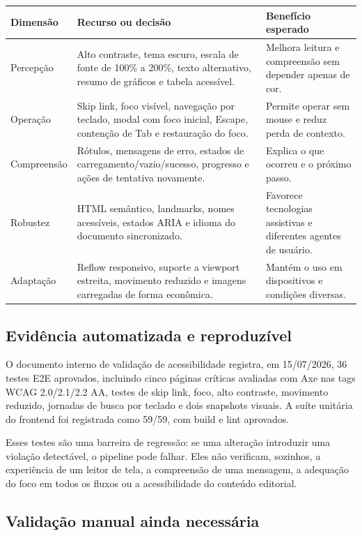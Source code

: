 \documentclass[11pt,a4paper]{article}
\begin{document}
\begin{longtable}{P{0.25\textwidth}P{0.42\textwidth}P{0.23\textwidth}}
\toprule
\textbf{Dimensão} & \textbf{Recurso ou decisão} & \textbf{Benefício esperado} \\
\midrule
\endhead
\bottomrule
\endfoot
Percepção & Alto contraste, tema escuro, escala de fonte de 100\% a 200\%, texto alternativo, resumo de gráficos e tabela acessível. & Melhora leitura e compreensão sem depender apenas de cor. \\
Operação & Skip link, foco visível, navegação por teclado, modal com foco inicial, Escape, contenção de Tab e restauração do foco. & Permite operar sem mouse e reduz perda de contexto. \\
Compreensão & Rótulos, mensagens de erro, estados de carregamento/vazio/sucesso, progresso e ações de tentativa novamente. & Explica o que ocorreu e o próximo passo. \\
Robustez & HTML semântico, landmarks, nomes acessíveis, estados ARIA e idioma do documento sincronizado. & Favorece tecnologias assistivas e diferentes agentes de usuário. \\
Adaptação & Reflow responsivo, suporte a viewport estreita, movimento reduzido e imagens carregadas de forma econômica. & Mantém o uso em dispositivos e condições diversas. \\
\end{longtable}

\subsection{Evidência automatizada e reproduzível}

O documento interno de validação de acessibilidade registra, em 15/07/2026, 36 testes E2E aprovados, incluindo cinco páginas críticas avaliadas com Axe nas tags WCAG 2.0/2.1/2.2 AA, testes de skip link, foco, alto contraste, movimento reduzido, jornadas de busca por teclado e dois snapshots visuais. A suíte unitária do frontend foi registrada como 59/59, com build e lint aprovados.

Esses testes são uma barreira de regressão: se uma alteração introduzir uma violação detectável, o pipeline pode falhar. Eles não verificam, sozinhos, a experiência de um leitor de tela, a compreensão de uma mensagem, a adequação do foco em todos os fluxos ou a acessibilidade do conteúdo editorial.

\subsection{Validação manual ainda necessária}
\end{document}

